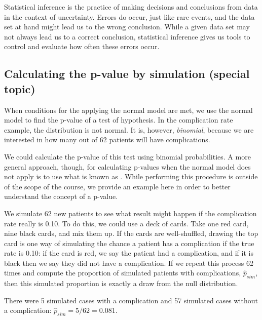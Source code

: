 Statistical inference is the practice of making decisions and conclusions from data in the context of uncertainty. Errors do occur, just like rare events, and the data set at hand might lead us to the wrong conclusion. While a given data set may not always lead us to a correct conclusion, statistical inference gives us tools to control and evaluate how often these errors occur.


\subsection{Calculating the p-value by simulation (special topic)}

When conditions for the applying the normal model are met, we use the normal model to find the p-value of a test of hypothesis.  In the complication rate example, the distribution is not normal.  It is, however, \emph{binomial}, because we are interested in how many out of 62 patients will have complications.  

We could calculate the p-value of this test using binomial probabilities.  A more general approach, though, for calculating p-values when the normal model does not apply is to use what is known as .  While performing this procedure is outside of the scope of the course, we provide an example here in order to better understand the concept of a p-value.

We simulate 62 new patients to see what result might happen if the complication rate really is 0.10.  To do this, we could use a deck of cards. Take one red card, nine black cards, and mix them up. If the cards are well-shuffled, drawing the top card is one way of simulating the chance a patient has a complication if the true rate is 0.10: if the card is red, we say the patient had a complication, and if it is black then we say they did not have a complication. If we repeat this process 62 times and compute the proportion of simulated patients with complications, $\hat{p}_{sim}$, then this simulated proportion is exactly a draw from the null distribution.

There were 5 simulated cases with a complication and 57 simulated cases without a complication: $\hat{p}_{sim} = 5/62 = 0.081$.

